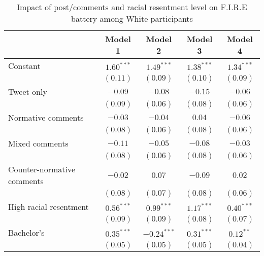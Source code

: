 
\begin{table}[h!]
\caption{Impact of post/comments and racial resentment level on F.I.R.E battery among White participants}
\begin{center}
\begin{scriptsize}
\begin{tabular}{l c c c c}
\toprule
 & Model 1 & Model 2 & Model 3 & Model 4 \\
\midrule
Constant                                            & $1.60^{***}$  & $1.49^{***}$  & $1.38^{***}$  & $1.34^{***}$ \\
                                                    & $(0.11)$      & $(0.09)$      & $(0.10)$      & $(0.09)$     \\
Tweet only                                          & $-0.09$       & $-0.08$       & $-0.15$       & $-0.06$      \\
                                                    & $(0.09)$      & $(0.06)$      & $(0.08)$      & $(0.06)$     \\
Normative comments                                  & $-0.03$       & $-0.04$       & $0.04$        & $-0.06$      \\
                                                    & $(0.08)$      & $(0.06)$      & $(0.08)$      & $(0.06)$     \\
Mixed comments                                      & $-0.11$       & $-0.05$       & $-0.08$       & $-0.03$      \\
                                                    & $(0.08)$      & $(0.06)$      & $(0.08)$      & $(0.06)$     \\
Counter-normative comments                          & $-0.02$       & $0.07$        & $-0.09$       & $0.02$       \\
                                                    & $(0.08)$      & $(0.07)$      & $(0.08)$      & $(0.06)$     \\
High racial resentment                              & $0.56^{***}$  & $0.99^{***}$  & $1.17^{***}$  & $0.40^{***}$ \\
                                                    & $(0.09)$      & $(0.09)$      & $(0.08)$      & $(0.07)$     \\
Bachelor's                                          & $0.35^{***}$  & $-0.24^{***}$ & $0.31^{***}$  & $0.12^{**}$  \\
                                                    & $(0.05)$      & $(0.05)$      & $(0.05)$      & $(0.04)$     \\

\end{tabular}
\end{scriptsize}
\end{center}
\end{table}
